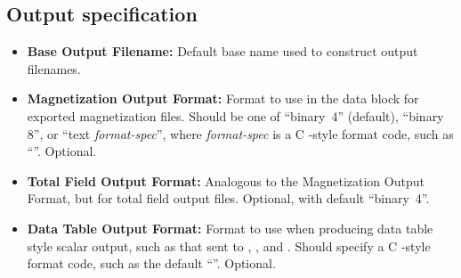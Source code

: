 \subsection{Output specification}\label{sec:mif1outspec}
\begin{itemize}
   \item {\bf Base Output Filename:} Default base name used to
      construct output filenames.
   \item {\bf Magnetization Output Format:}
      Format to use in the  data block for exported magnetization
      files.  Should be one of ``binary~4'' (default), ``binary 8'', or
      ``text {\em format-spec}'', where {\em format-spec} is a C
      \cd{printf}-style format code, such as ``\cd{\%\lb~.17g}''.
       Optional.
   \item {\bf Total Field Output Format:}
      Analogous to the Magnetization Output Format, but for total field
      output files.  Optional, with default ``binary~4''.
   \item {\bf Data Table Output Format:}
      Format to use when producing data table style scalar output, such
      as that sent to
      ,
      , and
      .
      Should specify a C -style format code, such as the
      default ``\cd{\%.16g}''.  Optional.
\end{itemize}

